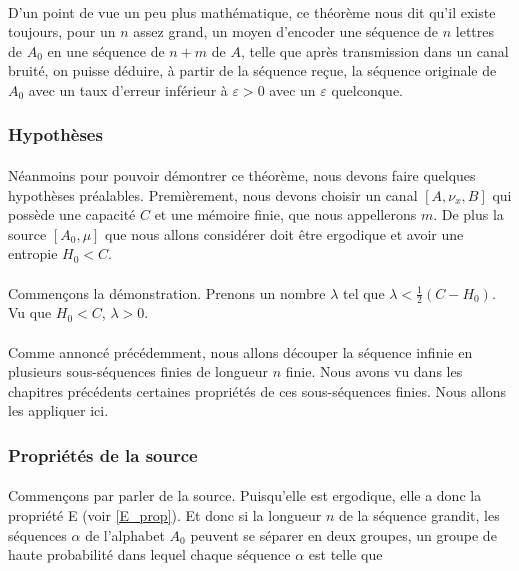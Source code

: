 	\paragraph{}
	D'un point de vue un peu plus mathématique, ce théorème nous dit
	qu'il existe toujours, pour un $n$ assez grand, un moyen d'encoder une 
	séquence de $n$ lettres de $A_0$ en une séquence de $n+m$ de $A$, telle
	que après transmission dans un canal bruité, on puisse déduire, 
	à partir de la séquence reçue, la séquence originale de $A_0$ avec un taux
	d'erreur inférieur à $\varepsilon >0$ avec un $\varepsilon$ quelconque.
	
\subsubsection*{Hypothèses}
	
	\paragraph{}
	Néanmoins pour pouvoir démontrer ce théorème, nous devons faire quelques
	hypothèses préalables. Premièrement, nous devons choisir un
	canal $[A,\nu_x,B]$ qui possède une capacité $C$ et une mémoire finie,
	que nous appellerons $m$. De plus la source $[A_0,\mu]$ que nous allons
	considérer doit être ergodique et avoir une entropie $H_0 < C$.

	\paragraph{}
	Commençons la démonstration. Prenons un nombre $\lambda$ tel que 
	$\lambda<\frac{1}{2}(C-H_0)$. Vu que $H_0 < C$, $\lambda>0$. 
	
	\paragraph{}
	Comme annoncé précédemment, nous allons découper la séquence infinie
	en plusieurs sous-séquences finies de longueur $n$ finie. Nous avons
	vu dans les chapitres précédents certaines propriétés de ces sous-séquences
	finies. Nous allons les appliquer ici.

\subsubsection*{Propriétés de la source}
	
	\paragraph{}
	Commençons par parler de la source. Puisqu'elle est ergodique, elle a
	donc la propriété E (voir \ref{E_prop}). Et donc si la longueur $n$
	de la séquence grandit, les séquences $\alpha$ de l'alphabet
	$A_0$ peuvent se séparer en deux groupes, un groupe de haute 
	probabilité dans lequel chaque séquence $\alpha$ est telle que
	
